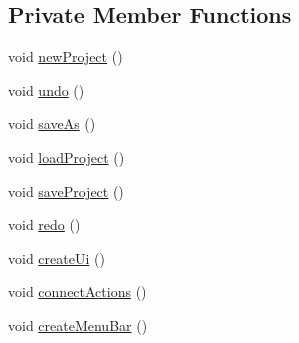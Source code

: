 \subsection*{Private Member Functions}
\begin{DoxyCompactItemize}
\item 
void \hyperlink{classGUI_1_1MainWindow_ae128dfd6fbafee0370f9912e4112f054}{new\+Project} ()
\item 
void \hyperlink{classGUI_1_1MainWindow_a0e1e7804a53f6d62efc72c9bdbec8571}{undo} ()
\item 
void \hyperlink{classGUI_1_1MainWindow_a65005f9a81d8c7396e2583a80a1f70bf}{save\+As} ()
\item 
void \hyperlink{classGUI_1_1MainWindow_adb575720306afca2c0e0c5930467321b}{load\+Project} ()
\item 
void \hyperlink{classGUI_1_1MainWindow_a5de2650de39370a5fe89f8d918966276}{save\+Project} ()
\item 
void \hyperlink{classGUI_1_1MainWindow_a93c48d6ed036e1a381be53ac67643284}{redo} ()
\item 
void \hyperlink{classGUI_1_1MainWindow_aa72182c9a958af0e87b65ab7bdba0035}{create\+Ui} ()
\item 
void \hyperlink{classGUI_1_1MainWindow_ac3ca31ff0047daecf8bbe393a15e940c}{connect\+Actions} ()
\item 
void \hyperlink{classGUI_1_1MainWindow_a5421da114e56e8856aa455426c24f805}{create\+Menu\+Bar} ()
\end{DoxyCompactItemize}
